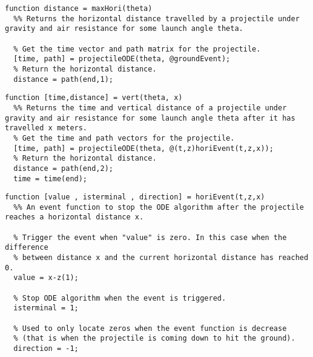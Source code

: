 \documentclass[12pt]{article}
\begin{document}
\begin{lstlisting}[caption={maxHori function}, label={1_maxHori}]
  function distance = maxHori(theta)
  %% Returns the horizontal distance travelled by a projectile under gravity and air resistance for some launch angle theta.

  % Get the time vector and path matrix for the projectile.
  [time, path] = projectileODE(theta, @groundEvent);
  % Return the horizontal distance.
  distance = path(end,1);
\end{lstlisting}

\begin{lstlisting}[caption={vert function},label={2_vert}]
  function [time,distance] = vert(theta, x)
  %% Returns the time and vertical distance of a projectile under gravity and air resistance for some launch angle theta after it has travelled x meters.
  % Get the time and path vectors for the projectile.
  [time, path] = projectileODE(theta, @(t,z)horiEvent(t,z,x));
  % Return the horizontal distance.
  distance = path(end,2);
  time = time(end);
\end{lstlisting}

\begin{lstlisting}[caption={horiEvent function},label={2_horiEvent}]
  function [value , isterminal , direction] = horiEvent(t,z,x)
  %% An event function to stop the ODE algorithm after the projectile reaches a horizontal distance x.

  % Trigger the event when "value" is zero. In this case when the difference
  % between distance x and the current horizontal distance has reached 0.
  value = x-z(1);

  % Stop ODE algorithm when the event is triggered.
  isterminal = 1;

  % Used to only locate zeros when the event function is decrease
  % (that is when the projectile is coming down to hit the ground).
  direction = -1;
\end{lstlisting}
\end{document}
